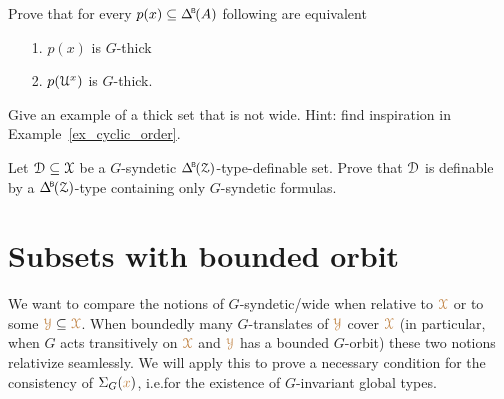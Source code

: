 \begin{exercise}\label{ex_thick_types}
  Prove that for every $p(x)\subseteq \BDelta(A)$ following are equivalent
  \begin{itemize}
    \item[1.] $p(x)$ is $G$-thick
    \item[2.] $p(\EuScript U^x)$ is $G$-thick.
  \end{itemize}
\end{exercise}

\begin{exercise}
  Give an example of a thick set that is not wide.
  Hint: find inspiration in Example~\ref{ex_cyclic_order}.
\end{exercise}

\begin{exercise}\label{ex_syndetic_type_vs_formulas}
  Let $\EuScript D\subseteq\EuScript X$ be a $G$-syndetic $\BDelta(\Z)$-type-definable set.
  Prove that $\EuScript D$ is definable by a $\BDelta(\Z)$-type containing only $G$-syndetic formulas.
\end{exercise}



\section{Subsets with bounded orbit}

We want to compare the notions of $G$-syndetic/wide when relative to ${\color{brown}\EuScript X}$ or to some ${\color{brown}\EuScript Y}\subseteq{\color{brown}\EuScript X}$.
When boundedly many $G$-translates of ${\color{brown}\EuScript Y}$ cover ${\color{brown}\EuScript X}$ (in particular, when $G$ acts transitively on ${\color{brown}\EuScript X}$ and ${\color{brown}\EuScript Y}$ has a bounded $G$-orbit) these two notions relativize seamlessly.
We will apply this to prove a necessary condition for the consistency of $\Sigma_G({\color{brown} x})$, i.e.\@ for the existence of $G$-invariant global types.

